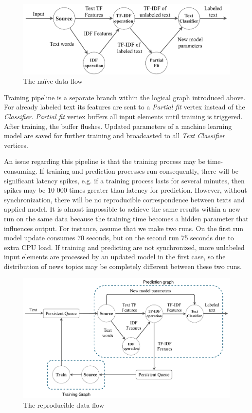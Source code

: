 \begin{figure}[htbp]
  \centering
  \includegraphics[scale=0.38]{pics/logical-graph}
  \caption{The na\"ive data flow}
  \label {logical_graph}
\end{figure}

Training pipeline is a separate branch within the logical graph introduced above. For already labeled text its features are sent to a {\em Partial fit} vertex instead of the {\em Classifier}. {\em Partial fit} vertex buffers all input elements until training is triggered. After training, the buffer flushes. Updated parameters of a machine learning model are saved for further training and broadcasted to all {\em Text Classifier} vertices.

An issue regarding this pipeline is that the training process may be time-consuming. If training and prediction processes run consequently, there will be significant latency spikes, e.g. if a training process lasts for several minutes, then spikes may be 10 000 times greater than latency for prediction. However, without synchronization, there will be no reproducible correspondence between texts and applied model. It is almost impossible to achieve the same results within a new run on the same data because the training time becomes a hidden parameter that influences output. For instance, assume that we make two runs. On the first run model update consumes 70 seconds, but on the second run 75 seconds due to extra CPU load. If training and predicting are not synchronized, more unlabeled input elements are processed by an updated model in the first case, so the distribution of news topics may be completely different between these two runs. 

\begin{figure}[htbp]
  \centering
  \includegraphics[scale=0.300]{pics/pipeline}
  \caption{The reproducible data flow}
  \label {pipeline}
\end{figure}

